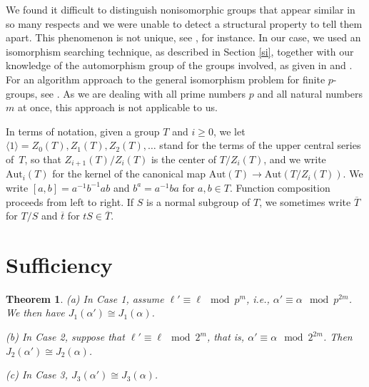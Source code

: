 \documentclass{amsart}
\newtheorem{theorem}{Theorem}[section]
\theoremstyle{definition}
\theoremstyle{remark}
\begin{document}
We found it difficult to distinguish nonisomorphic groups that appear similar in so many respects and we were unable
to detect a structural property to tell them apart. This phenomenon is not unique, see \cite{LW}, for instance.
In our case, we used an isomorphism searching technique, as described in Section \ref{si}, together with our knowledge
of the automorphism group of the groups involved, as given in \cite{MS2} and \cite{MS3}. For an algorithm approach
to the general isomorphism problem for finite $p$-groups, see \cite{O}. As we are dealing with all prime numbers $p$
and all natural numbers $m$ at once, this approach is not applicable to us.

In terms of notation, given a group $T$ and $i\geq 0$, we let $\langle 1\rangle=Z_0(T),Z_1(T),Z_2(T),\dots$ stand for the terms of the upper central series of~$T$, so that $Z_{i+1}(T)/Z_i(T)$ is the center of $T/Z_i(T)$, and we write $\mathrm{Aut}_i(T)$ for the kernel of the canonical map $\mathrm{Aut}(T)\to \mathrm{Aut}(T/Z_i(T))$. We write $[a,b]=a^{-1}b^{-1}ab$ and $b^a=a^{-1}ba$ for $a,b\in T$.
Function composition proceeds from left to right. If $S$ is a normal subgroup of $T$,
we sometimes write $\overline{T}$ for $T/S$ and $\overline{t}$ for $tS\in \overline{T}$.


\section{Sufficiency}

\begin{theorem}\label{suf} (a) In Case 1, assume
$\ell'\equiv \ell\mod p^{m}$, i.e., $\alpha'\equiv\alpha\mod p^{2m}$. We then have
$J_1(\alpha')\cong J_1(\alpha)$.

(b) In Case 2, suppose that $\ell'\equiv \ell\mod 2^{m}$, that is, $\alpha'\equiv\alpha\mod 2^{2m}$. Then
$J_2(\alpha')\cong J_2(\alpha)$.

(c) In Case 3, $J_3(\alpha')\cong J_3(\alpha)$.

\end{theorem}
\end{document}
